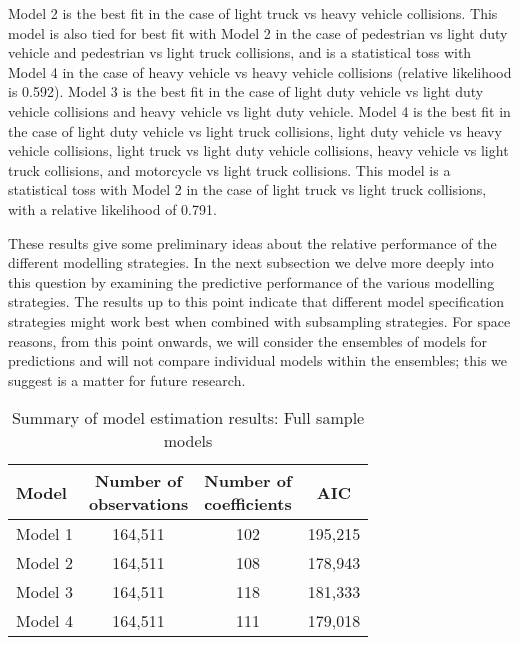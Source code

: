 \documentclass[]{elsarticle} %
\begin{document}
Model 2 is the best fit in the case of light truck vs heavy vehicle
collisions. This model is also tied for best fit with Model 2 in the
case of pedestrian vs light duty vehicle and pedestrian vs light truck
collisions, and is a statistical toss with Model 4 in the case of heavy
vehicle vs heavy vehicle collisions (relative likelihood is 0.592).
Model 3 is the best fit in the case of light duty vehicle vs light duty
vehicle collisions and heavy vehicle vs light duty vehicle. Model 4 is
the best fit in the case of light duty vehicle vs light truck
collisions, light duty vehicle vs heavy vehicle collisions, light truck
vs light duty vehicle collisions, heavy vehicle vs light truck
collisions, and motorcycle vs light truck collisions. This model is a
statistical toss with Model 2 in the case of light truck vs light truck
collisions, with a relative likelihood of 0.791.

These results give some preliminary ideas about the relative performance
of the different modelling strategies. In the next subsection we delve
more deeply into this question by examining the predictive performance
of the various modelling strategies. The results up to this point
indicate that different model specification strategies might work best
when combined with subsampling strategies. For space reasons, from this
point onwards, we will consider the ensembles of models for predictions
and will not compare individual models within the ensembles; this we
suggest is a matter for future research.

\begin{table}

\caption{\label{tab:model-full-sample-summary}\label{tab:model-full-sample-summary}Summary of model estimation results: Full sample models}
\centering
\fontsize{7}{9}\selectfont
\begin{tabular}[t]{lccc}
\toprule
Model & \makecell[l]{Number of\\observations} & \makecell[l]{Number of\\coefficients} & AIC\\
\midrule
\rowcolor{gray!6}  Model 1 & 164,511 & 102 & 195,215\\
Model 2 & 164,511 & 108 & 178,943\\
\rowcolor{gray!6}  Model 3 & 164,511 & 118 & 181,333\\
Model 4 & 164,511 & 111 & 179,018\\
\bottomrule
\end{tabular}
\end{table}
\end{document}

